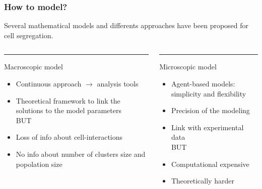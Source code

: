 \documentclass[10pt]{beamer}
\begin{document}
\begin{frame}
\frametitle{How to model?}
Several mathematical models and differents approaches have been proposed for cell segregation. 

\vspace{0.5cm}
\begin{columns}[T] %
	\begin{column}{.48\textwidth}
		\color{blue}\rule{\linewidth}{4pt}
			Macroscopic model	
		\begin{itemize}
			\item Continuous approach $\rightarrow$ analysis tools
			\item Theoretical framework to link the solutions to the model parameters \\
			\vspace{0.5cm}
			BUT
			\item Loss of info about cell-interactions
			\item No info about number of clusters size and popolation size
		\end{itemize}
		
		
	\end{column}%
	\hfill%
	\begin{column}{.48\textwidth}
		\color{blue}\rule{\linewidth}{4pt}
	Microscopic model	
\begin{itemize}
	\item Agent-based models: simplicity and flexibility
	\item Precision of the modeling
	\item Link with experimental data \\
	\vspace{0.5cm}
	BUT
	\item Computational expensive
	\item Theoretically harder
\end{itemize}
		
	\end{column}%
\end{columns}
\end{frame}
\end{document}
